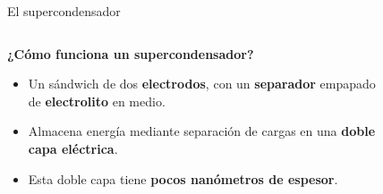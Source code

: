 \documentclass[aspectratio=169]{beamer}
\begin{document}
%
%

	\begin{frame}{El supercondensador}
		\begin{columns}
			\begin{column}{0.5\textwidth}
				\only<1->\textbf{¿Cómo funciona un supercondensador?}
				\begin{itemize}
					\item<2-> Un sándwich de dos \textbf{electrodos}, con un \textbf{separador} empapado de \textbf{electrolito} en medio.
					\item<3-> Almacena energía mediante separación de cargas en una \textbf{doble capa eléctrica}.
					\item<4-> Esta doble capa tiene \textbf{pocos nanómetros de espesor}.
				\end{itemize}
			\end{column}
			\begin{column}{0.5\textwidth}
				\begin{figure}[h!]
					\centering
\end{figure}
\end{column}
\end{columns}
\end{frame}
\end{document}
